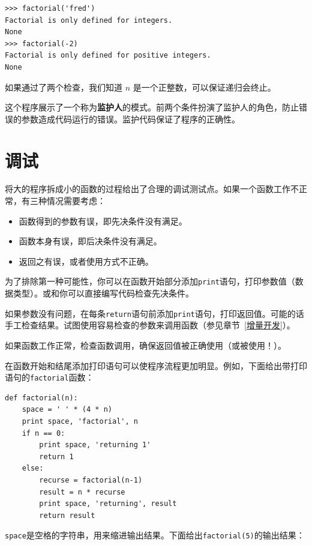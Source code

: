 \beforeverb
\begin{verbatim}
>>> factorial('fred')
Factorial is only defined for integers.
None
>>> factorial(-2)
Factorial is only defined for positive integers.
None
\end{verbatim}
\afterverb
%
如果通过了两个检查，我们知道 $n$ 是一个正整数，可以保证递归会终止。


这个程序展示了一个称为{\bf 监护人}的模式。前两个条件扮演了监护人的角色，防止错误的参数造成代码运行的错误。监护代码保证了程序的正确性。


\section{调试}
\label{factdebug}


将大的程序拆成小的函数的过程给出了合理的调试测试点。如果一个函数工作不正常，有三种情况需要考虑：

\begin{itemize}

\item 函数得到的参数有误，即先决条件没有满足。

\item 函数本身有误，即后决条件没有满足。

\item 返回之有误，或者使用方式不正确。

\end{itemize}

为了排除第一种可能性，你可以在函数开始部分添加{\tt print}语句，打印参数值（数据类型）。或和你可以直接编写代码检查先决条件。


如果参数没有问题，在每条{\tt return}语句前添加{\tt print}语句，打印返回值。可能的话手工检查结果。试图使用容易检查的参数来调用函数（参见章节~\ref{增量开发}）。

如果函数工作正常，检查函数调用，确保返回值被正确使用（或被使用！）。


在函数开始和结尾添加打印语句可以使程序流程更加明显。例如，下面给出带打印语句的{\tt factorial}函数：

\beforeverb
\begin{verbatim}
def factorial(n):
    space = ' ' * (4 * n)
    print space, 'factorial', n
    if n == 0:
        print space, 'returning 1'
        return 1
    else:
        recurse = factorial(n-1)
        result = n * recurse
        print space, 'returning', result
        return result
\end{verbatim}
\afterverb
%
{\tt space}是空格的字符串，用来缩进输出结果。下面给出{\tt factorial(5)}的输出结果：

